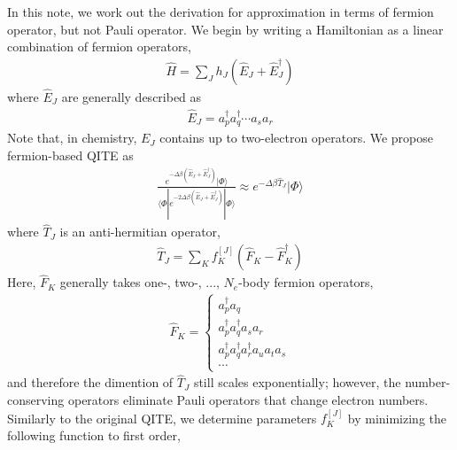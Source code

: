 \documentclass[prb,amsmath,amsfonts,amssymb]{revtex4}
\begin{document}
In this note, we work out the derivation for approximation in terms of fermion operator, but not Pauli operator. We begin by writing a Hamiltonian as a linear combination of fermion operators,
\begin{align}
	\hat H = \sum_{J} h_J \left(\hat E_J + \hat E_J^\dag\right)
\end{align}
where $\hat E_J$ are generally described as
\begin{align}
	\hat E_J = a_p^\dag a_q^\dag \cdots a_ s a_r
\end{align}
Note that, in chemistry, $E_J$ contains up to two-electron operators. We propose fermion-based QITE as
\begin{align}
\frac{e^{-\Delta \beta (\hat E_J + \hat E_J^\dag)}|\Phi\rangle}{\langle\Phi|e^{-2\Delta \beta(\hat E_J + \hat E_J^\dag)}|\Phi\rangle}
\approx 
e^{- \Delta \beta \hat T_J}|\Phi\rangle\label{eq:FB-QITE}
\end{align}
where $\hat T_J$ is an anti-hermitian operator,
\begin{align}
	\hat T_J = \sum_{K} f^{[J]}_{K}(\hat F_K - \hat F_K^\dag)
\end{align}
Here, $\hat F_K$ generally takes one-, two-, ..., $N_e$-body fermion operators,
\begin{align}
	\hat F_K = \begin{cases}
		a_p^\dag a_q\\
		a_p^\dag a_q^\dag a_s a_r\\
		a_p^\dag a_q^\dag a_r^\dag a_u a_t a_s \\
		\cdots
	\end{cases}
\end{align} 
and therefore the dimention of $\hat T_J$ still scales exponentially; however, the number-conserving operators eliminate Pauli operators that change electron numbers. Similarly to the original QITE, we determine parameters $f^{[J]}_K$ by minimizing the following function to first order,
\end{document}
